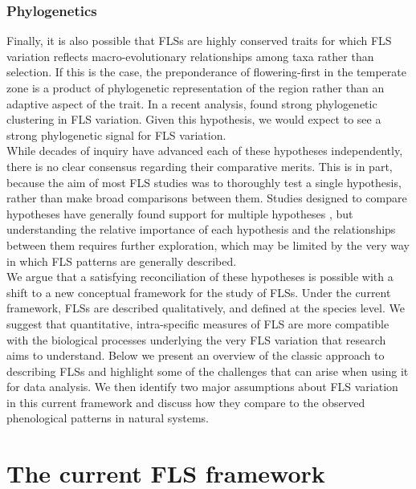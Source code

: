 \documentclass{article}
\begin{document}
\subsubsection*{Phylogenetics} 
\noindent Finally, it is also possible that FLSs are highly conserved traits for which FLS variation reflects macro-evolutionary relationships among taxa rather than selection. If this is the case, the preponderance of flowering-first in the temperate zone is a product of phylogenetic representation of the region rather than an adaptive aspect of the trait. In a recent analysis, \citet{Gougherty2018} found strong phylogenetic clustering in FLS variation. Given this hypothesis, we would expect to see a strong phylogenetic signal for FLS variation.\\

\noindent While decades of inquiry have advanced each of these hypotheses independently, there is no clear consensus regarding their comparative merits. This is in part, because the aim of most FLS studies was to thoroughly test a single hypothesis, rather than make broad comparisons between them. Studies designed to compare hypotheses have generally found support for multiple hypotheses \citep[see][]{Bolmgren2003,Gougherty2018}, but understanding the relative importance of each hypothesis and the relationships between them requires further exploration, which may be limited by the very way in which FLS patterns are generally described.\\

\noindent We argue that a satisfying reconciliation of these hypotheses is possible with a shift to a new conceptual framework for the study of FLSs. Under the current framework, FLSs are described qualitatively, and defined at the species level. We suggest that quantitative, intra-specific measures of FLS are more compatible with the biological processes underlying the very FLS variation that research aims to understand. Below we present an overview of the classic approach to describing FLSs and highlight some of the challenges that can arise when using it for data analysis. We then identify two major assumptions about FLS variation in this current framework and discuss how they compare to the observed phenological patterns in natural systems.\\

\section*{The current FLS framework}
\end{document}
